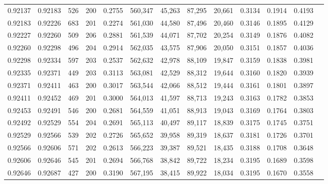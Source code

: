 \begin{tabular}{rrrrrrrrrrrrr}
0.92137 & 0.92183 &   526 & 200 &                                     0.2755 & 560,347 &  45,263 &  87,295 &  20,661 & 0.3134 & 0.1914 & 0.4193 \\
0.92183 & 0.92226 &   683 & 201 &                                     0.2274 & 561,030 &  44,580 &  87,496 &  20,460 & 0.3146 & 0.1895 & 0.4129 \\
0.92227 & 0.92260 &   509 & 206 &                                     0.2881 & 561,539 &  44,071 &  87,702 &  20,254 & 0.3149 & 0.1876 & 0.4082 \\
0.92260 & 0.92298 &   496 & 204 &                                     0.2914 & 562,035 &  43,575 &  87,906 &  20,050 & 0.3151 & 0.1857 & 0.4036 \\
0.92298 & 0.92334 &   597 & 203 &                                     0.2537 & 562,632 &  42,978 &  88,109 &  19,847 & 0.3159 & 0.1838 & 0.3981 \\
0.92335 & 0.92371 &   449 & 203 &                                     0.3113 & 563,081 &  42,529 &  88,312 &  19,644 & 0.3160 & 0.1820 & 0.3939 \\
0.92371 & 0.92411 &   463 & 200 &                                     0.3017 & 563,544 &  42,066 &  88,512 &  19,444 & 0.3161 & 0.1801 & 0.3897 \\
0.92411 & 0.92452 &   469 & 201 &                                     0.3000 & 564,013 &  41,597 &  88,713 &  19,243 & 0.3163 & 0.1782 & 0.3853 \\
0.92453 & 0.92491 &   546 & 200 &                                     0.2681 & 564,559 &  41,051 &  88,913 &  19,043 & 0.3169 & 0.1764 & 0.3803 \\
0.92492 & 0.92529 &   554 & 204 &                                     0.2691 & 565,113 &  40,497 &  89,117 &  18,839 & 0.3175 & 0.1745 & 0.3751 \\
0.92529 & 0.92566 &   539 & 202 &                                     0.2726 & 565,652 &  39,958 &  89,319 &  18,637 & 0.3181 & 0.1726 & 0.3701 \\
0.92566 & 0.92606 &   571 & 202 &                                     0.2613 & 566,223 &  39,387 &  89,521 &  18,435 & 0.3188 & 0.1708 & 0.3648 \\
0.92606 & 0.92646 &   545 & 201 &                                     0.2694 & 566,768 &  38,842 &  89,722 &  18,234 & 0.3195 & 0.1689 & 0.3598 \\
0.92646 & 0.92687 &   427 & 200 &                                     0.3190 & 567,195 &  38,415 &  89,922 &  18,034 & 0.3195 & 0.1670 & 0.3558 \\

\end{tabular}
